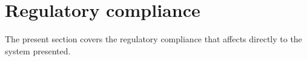 \section {Regulatory compliance}

The present section covers the regulatory compliance that affects directly to the system presented. 






	
